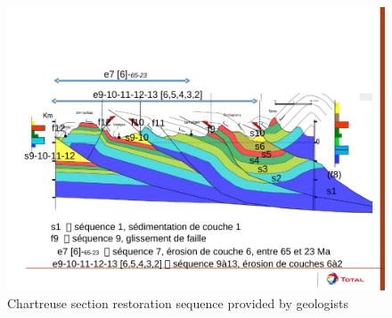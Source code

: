 \documentclass[12pt, a4paper]{report} %
\begin{document}
\begin{figure}[H]
	\centering
	\includegraphics[scale=0.7]{Coupe_Chartreuse_rediscutee.pdf}
	\caption{Chartreuse section restoration sequence provided by geologists}
	\label{chartreuseprovided}
\end{figure}



\end{document}
